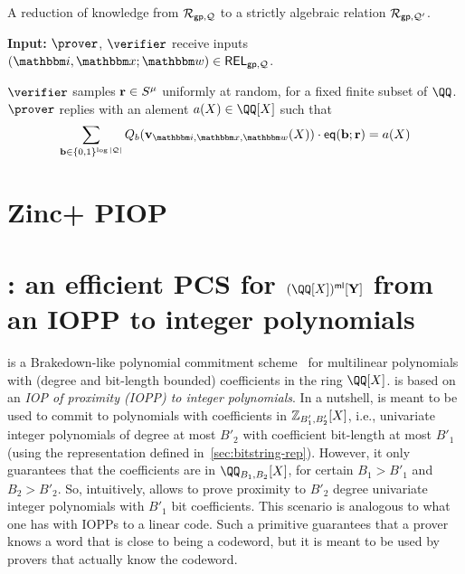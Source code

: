 \documentclass[11pt,letterpaper,usenames,dvipsnames]{article}
\begin{document}
    \begin{algorithm}[H]
  \caption{A 
      reduction of knowledge from $\mathcal{R}_{\mathsf{gp}, \mathcal{Q}}$ to a strictly algebraic relation $\mathcal{R}_{\mathsf{gp}, \mathcal{Q}'}$. \label{a: red_to_strictly_algebraic}}
  \textbf{Input:} $\Prover$, $\verifier$ receive inputs $(\idx, \inp; \wit)\in \REL_{\gp, \cQ}$. %
  \begin{algorithmic}[1]
          \STATE $\verifier$ samples $\mathbf{r}\in S^\mu$ uniformly at random, for a fixed finite subset of $\QQ$. 
          \STATE $\prover$ replies with an alement $a(X)\in \QQ[X]$ such that
          $$
          \sum_{\bb\in \{0,1\}^{\log|\cQ|}} Q_b(\vv_{\idx,\inp,\wit}(X))\cdot \eq(\bb; \rr) = a(X)
          $$
          \STATE 
  \end{algorithmic}
\end{algorithm}



\section{Zinc+ PIOP}





\section{\zipp: an efficient PCS for $(\QQ[X])^{\multilin}[\vec Y]$ from an IOPP to integer polynomials}
\label{sec:zip+}

\zipp is a Brakedown-like polynomial commitment scheme~\cite{C:GLSTW23} for multilinear polynomials with (degree and bit-length bounded) coefficients in the ring $\QQ[X]$. \zipp is based on an \emph{IOP of proximity (IOPP) to integer polynomials}. In a nutshell, \zipp is meant to be used to commit to polynomials with coefficients in $\mathbb{Z}_{B'_1,B'_2}[X]$, i.e., univariate integer polynomials of degree at most $B'_2$ with coefficient bit-length at most $B'_1$ (using the representation defined in~\cref{sec:bitstring-rep}). However, it only guarantees that the coefficients are in $\QQ_{B_1,B_2}[X]$, for certain $B_1>B'_1$ and $B_2>B'_2$. So, intuitively, \zipp allows to prove proximity to $B'_2$ degree univariate integer polynomials with $B'_1$ bit coefficients. This scenario is analogous to what one has with IOPPs to a linear code. Such a primitive guarantees that a prover knows a word that is close to being a codeword, but it is meant to be used by provers that actually know the codeword.
\end{document}
